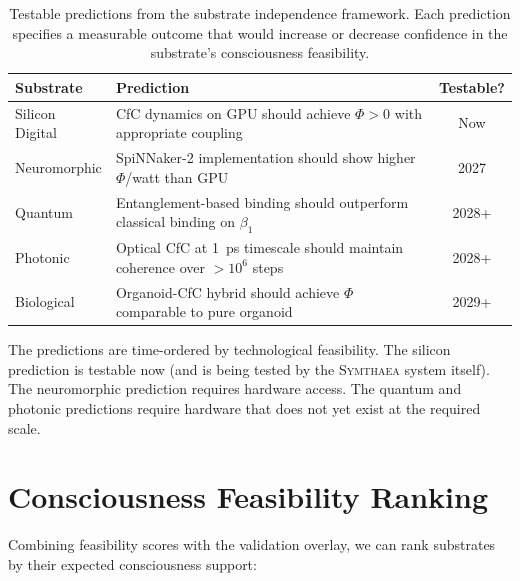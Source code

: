 \documentclass[12pt]{book}
\newcommand{\symthaea}{\textsc{Symthaea}}
\begin{document}
\begin{table}[H]
\centering
\caption{Testable predictions from the substrate independence framework. Each prediction specifies a measurable outcome that would increase or decrease confidence in the substrate's consciousness feasibility.}
\label{tab:testable-predictions}
\begin{tabular}{p{3cm}p{6cm}c}
\toprule
\textbf{Substrate} & \textbf{Prediction} & \textbf{Testable?} \\
\midrule
Silicon Digital & CfC dynamics on GPU should achieve $\Phi > 0$ with appropriate coupling & Now \\
Neuromorphic & SpiNNaker-2 implementation should show higher $\Phi$/watt than GPU & 2027 \\
Quantum & Entanglement-based binding should outperform classical binding on $\beta_1$ & 2028+ \\
Photonic & Optical CfC at 1~ps timescale should maintain coherence over $> 10^6$ steps & 2028+ \\
Biological & Organoid-CfC hybrid should achieve $\Phi$ comparable to pure organoid & 2029+ \\
\bottomrule
\end{tabular}
\end{table}

The predictions are time-ordered by technological feasibility. The silicon prediction is testable now (and is being tested by the \symthaea{} system itself). The neuromorphic prediction requires hardware access. The quantum and photonic predictions require hardware that does not yet exist at the required scale.

\section{Consciousness Feasibility Ranking}

Combining feasibility scores with the validation overlay, we can rank substrates by their expected consciousness support:
\end{document}
